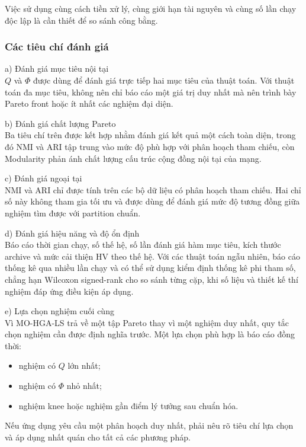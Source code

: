 \documentclass[14pt,a4paper]{extarticle}
\begin{document}
Việc sử dụng cùng cách tiền xử lý, cùng giới hạn tài nguyên và cùng số lần chạy độc lập là cần thiết để so sánh công bằng.

\subsubsection{Các tiêu chí đánh giá}

\noindent a) Đánh giá mục tiêu nội tại \\ \indent
$Q$ và $\Phi$ được dùng để đánh giá trực tiếp hai mục tiêu của thuật toán. Với thuật toán đa mục tiêu, không nên chỉ báo cáo một giá trị duy nhất mà nên trình bày Pareto front hoặc ít nhất các nghiệm đại diện.

\noindent b) Đánh giá chất lượng Pareto \\ \indent
Ba tiêu chí trên được kết hợp nhằm đánh giá kết quả một cách toàn diện, trong đó NMI và ARI tập trung vào mức độ phù hợp với phân hoạch tham chiếu, còn Modularity phản ánh chất lượng cấu trúc cộng đồng nội tại của mạng.

\noindent c) Đánh giá ngoại tại \\ \indent
NMI và ARI chỉ được tính trên các bộ dữ liệu có phân hoạch tham chiếu. Hai chỉ số này không tham gia tối ưu và được dùng để đánh giá mức độ tương đồng giữa nghiệm tìm được với partition chuẩn.

\noindent d) Đánh giá hiệu năng và độ ổn định \\ \indent
Báo cáo thời gian chạy, số thế hệ, số lần đánh giá hàm mục tiêu, kích thước archive và mức cải thiện HV theo thế hệ. Với các thuật toán ngẫu nhiên, báo cáo thống kê qua nhiều lần chạy và có thể sử dụng kiểm định thống kê phi tham số, chẳng hạn Wilcoxon signed-rank cho so sánh từng cặp, khi số liệu và thiết kế thí nghiệm đáp ứng điều kiện áp dụng.

\noindent e) Lựa chọn nghiệm cuối cùng \\ \indent
Vì MO-HGA-LS trả về một tập Pareto thay vì một nghiệm duy nhất, quy tắc chọn nghiệm cần được định nghĩa trước. Một lựa chọn phù hợp là báo cáo đồng thời:
\begin{itemize}
    \item nghiệm có $Q$ lớn nhất;
    \item nghiệm có $\Phi$ nhỏ nhất;
    \item nghiệm knee hoặc nghiệm gần điểm lý tưởng sau chuẩn hóa.
\end{itemize}
Nếu ứng dụng yêu cầu một phân hoạch duy nhất, phải nêu rõ tiêu chí lựa chọn và áp dụng nhất quán cho tất cả các phương pháp.
\end{document}
